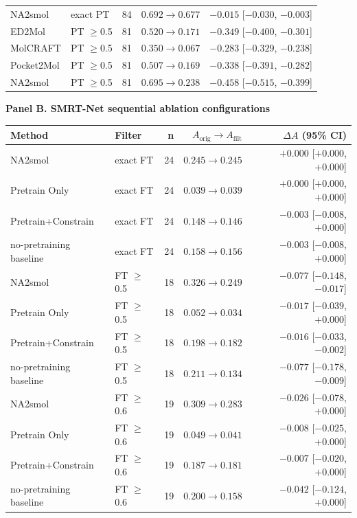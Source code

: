 \begin{tabular}{@{}llrrr@{}}
NA2smol & exact PT & 84 & $0.692\to 0.677$ & $-0.015$ [$-0.030$, $-0.003$] \\
ED2Mol & PT $\geq$0.5 & 81 & $0.520\to 0.171$ & $-0.349$ [$-0.400$, $-0.301$] \\
MolCRAFT & PT $\geq$0.5 & 81 & $0.350\to 0.067$ & $-0.283$ [$-0.329$, $-0.238$] \\
Pocket2Mol & PT $\geq$0.5 & 81 & $0.507\to 0.169$ & $-0.338$ [$-0.391$, $-0.282$] \\
NA2smol & PT $\geq$0.5 & 81 & $0.695\to 0.238$ & $-0.458$ [$-0.515$, $-0.399$] \\
\bottomrule
\end{tabular}


\textbf{Panel B. SMRT-Net sequential ablation configurations}

\setlength{\tabcolsep}{3pt}
\scriptsize
\begin{tabular}{@{}llrrr@{}}
\toprule
\textbf{Method} & \textbf{Filter} & \textbf{n} & \textbf{$A_{\text{orig}}\to A_{\text{filt}}$} & \textbf{$\Delta A$ (95\% CI)} \\
\midrule
NA2smol & exact FT & 24 & $0.245\to 0.245$ & $+0.000$ [$+0.000$, $+0.000$] \\
Pretrain Only & exact FT & 24 & $0.039\to 0.039$ & $+0.000$ [$+0.000$, $+0.000$] \\
Pretrain+Constrain & exact FT & 24 & $0.148\to 0.146$ & $-0.003$ [$-0.008$, $+0.000$] \\
no-pretraining baseline & exact FT & 24 & $0.158\to 0.156$ & $-0.003$ [$-0.008$, $+0.000$] \\
NA2smol & FT $\geq$0.5 & 18 & $0.326\to 0.249$ & $-0.077$ [$-0.148$, $-0.017$] \\
Pretrain Only & FT $\geq$0.5 & 18 & $0.052\to 0.034$ & $-0.017$ [$-0.039$, $+0.000$] \\
Pretrain+Constrain & FT $\geq$0.5 & 18 & $0.198\to 0.182$ & $-0.016$ [$-0.033$, $-0.002$] \\
no-pretraining baseline & FT $\geq$0.5 & 18 & $0.211\to 0.134$ & $-0.077$ [$-0.178$, $-0.009$] \\
NA2smol & FT $\geq$0.6 & 19 & $0.309\to 0.283$ & $-0.026$ [$-0.078$, $+0.000$] \\
Pretrain Only & FT $\geq$0.6 & 19 & $0.049\to 0.041$ & $-0.008$ [$-0.025$, $+0.000$] \\
Pretrain+Constrain & FT $\geq$0.6 & 19 & $0.187\to 0.181$ & $-0.007$ [$-0.020$, $+0.000$] \\
no-pretraining baseline & FT $\geq$0.6 & 19 & $0.200\to 0.158$ & $-0.042$ [$-0.124$, $+0.000$] \\

\end{tabular}
